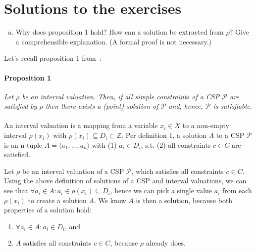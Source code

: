 \section{Solutions to the exercises}

\begin{enumerate}[(a)]
\item Why does proposition 1 hold? How can a solution be extracted from $\rho$? Give a comprehensible explanation. (A formal proof is not necessary.)
\end{enumerate}


Let's recall proposition 1 from~\cite{MF19}:

\paragraph{Proposition 1}
\emph{Let $\rho$ be an interval valuation.}
\emph{Then, if all simple constraints of a CSP $\mathcal{P}$ are satisfied by $\rho$ then there exists a (point) solution of $\mathcal{P}$ and, hence, $\mathcal{P}$ is satisfiable.}


\paragraph{}
An interval valuation is a mapping from a variable $x_i \in X$ to a non-empty interval $\rho(x_i)$ with $p(x_i) \subseteq D_i \subset \mathbb{Z}$.
Per definition 1, a solution $A$ to a CSP $\mathcal{P}$ is an n-tuple $A = \langle a_1, ..., a_n \rangle$ with (1) $a_i \in D_i$, s.t. (2) all constraints $c \in C$ are satisfied.~\cite{MF19}

Let $\rho$ be an interval valuation of a CSP $\mathcal{P}$, which satisfies all constraints $c \in C$.
Using the above definition of solutions of a CSP and interval valuations, we can see that $\forall a_i \in A: a_i \in \rho(x_i) \subseteq D_i$, hence we can pick a single value $a_i$ from each $\rho(x_i)$ to create a solution $A$.
We know $A$ is then a solution, because both properties of a solution hold:

\begin{enumerate}[(1)]
    \item $\forall a_i \in A: a_i \in D_i$, and
    \item $A$ satisfies all constraints $c \in C$, because $\rho$ already does.
\end{enumerate}
